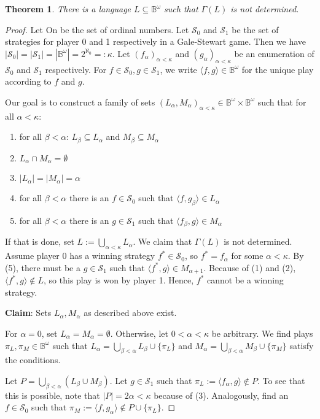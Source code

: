 \documentclass{article}
\newtheorem{theorem}{Theorem}
\begin{document}
\begin{theorem}
	There is a language $L \subseteq \mathbb{B}^\omega$ such that $\Gamma(L)$ is not determined.
\end{theorem}
\begin{proof}
	Let On be the set of ordinal numbers. Let $\mathcal{S}_0$ and $\mathcal{S}_1$ be the set of strategies for player 0 and 1 respectively in a Gale-Stewart game. Then we have $|\mathcal{S}_0| = |\mathcal{S}_1| = |\mathbb{B}^\omega| = 2^{\aleph_0} =: \kappa$. Let $(f_\alpha)_{\alpha < \kappa}$ and $(g_\alpha)_{\alpha < \kappa}$ be an enumeration of $\mathcal{S_0}$ and $\mathcal{S}_1$ respectively. For $f \in \mathcal{S}_0, g \in \mathcal{S}_1$, we write $\langle f, g \rangle \in \mathbb{B}^\omega$ for the unique play according to $f$ and $g$.
	
	Our goal is to construct a family of sets $(L_\alpha, M_\alpha)_{\alpha < \kappa} \in \mathbb{B}^\omega \times \mathbb{B}^\omega$ such that for all $\alpha < \kappa$:
	\begin{enumerate}
		\item for all $\beta < \alpha$: $L_\beta \subseteq L_\alpha$ and $M_\beta \subseteq M_\alpha$
		\item $L_\alpha \cap M_\alpha = \emptyset$
		\item $|L_\alpha| = |M_\alpha| = \alpha$
		\item for all $\beta < \alpha$ there is an $f \in \mathcal{S}_0$ such that $\langle f, g_\beta \rangle \in L_\alpha$
		\item for all $\beta < \alpha$ there is an $g \in \mathcal{S}_1$ such that $\langle f_\beta, g \rangle \in M_\alpha$
	\end{enumerate}
	
	If that is done, set $L := \bigcup\limits_{\alpha < \kappa} L_\alpha$. We claim that $\Gamma(L)$ is not determined. Assume player 0 has a winning strategy $f^* \in \mathcal{S}_0$, so $f^* = f_\alpha$ for some $\alpha < \kappa$. By (5), there must be a $g \in \mathcal{S}_1$ such that $\langle f^*, g \rangle \in M_{\alpha+1}$. Because of (1) and (2), $\langle f^*, g \rangle \notin L$, so this play is won by player 1. Hence, $f^*$ cannot be a winning strategy. 
	
	\textbf{Claim}: Sets $L_\alpha, M_\alpha$ as described above exist.
	
	For $\alpha = 0$, set $L_\alpha = M_\alpha = \emptyset$. Otherwise, let $0 < \alpha < \kappa$ be arbitrary. We find plays $\pi_L, \pi_M \in \mathbb{B}^\omega$ such that $L_\alpha = \bigcup\limits_{\beta < \alpha} L_\beta \cup \{\pi_L\}$ and $M_\alpha = \bigcup\limits_{\beta < \alpha} M_\beta \cup \{\pi_M\}$ satisfy the conditions.
	
	Let $P = \bigcup\limits_{\beta < \alpha} (L_\beta \cup M_\beta)$. Let $g \in \mathcal{S}_1$ such that $\pi_L := \langle f_\alpha, g \rangle \notin P$. To see that this is possible, note that $|P| = 2 \alpha < \kappa$ because of (3). Analogously, find an $f \in \mathcal{S}_0$ such that $\pi_M := \langle f, g_\alpha \rangle \notin P \cup \{\pi_L\}$. 
\end{proof}
\end{document}
